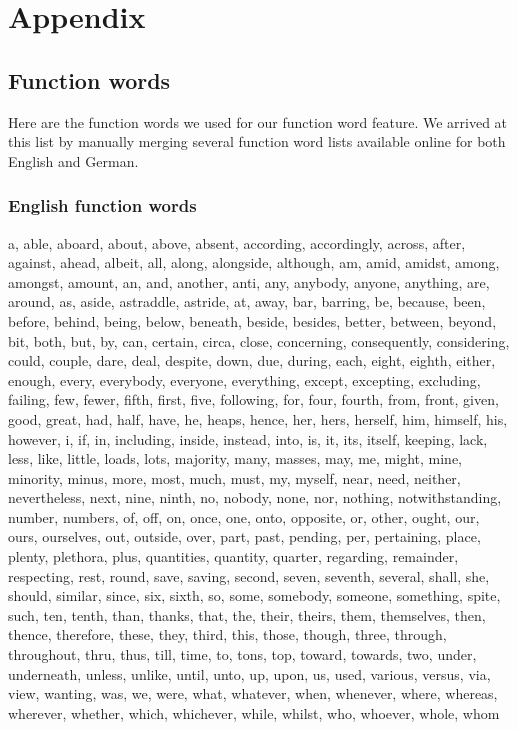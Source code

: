 \section{Appendix}
\label{sec:appendix}

\subsection{Function words}
\label{sec:app_function_words}
Here are the function words we used for our function word feature. We arrived at this list by manually merging several function word lists available online for both English and German.


\subsubsection{English function words}
a, able, aboard, about, above, absent, according, accordingly, across, after, against, ahead, albeit, all, along, alongside, although, am, amid, amidst, among, amongst, amount, an, and, another, anti, any, anybody, anyone, anything, are, around, as, aside, astraddle, astride, at, away, bar, barring, be, because, been, before, behind, being, below, beneath, beside, besides, better, between, beyond, bit, both, but, by, can, certain, circa, close, concerning, consequently, considering, could, couple, dare, deal, despite, down, due, during, each, eight, eighth, either, enough, every, everybody, everyone, everything, except, excepting, excluding, failing, few, fewer, fifth, first, five, following, for, four, fourth, from, front, given, good, great, had, half, have, he, heaps, hence, her, hers, herself, him, himself, his, however, i, if, in, including, inside, instead, into, is, it, its, itself, keeping, lack, less, like, little, loads, lots, majority, many, masses, may, me, might, mine, minority, minus, more, most, much, must, my, myself, near, need, neither, nevertheless, next, nine, ninth, no, nobody, none, nor, nothing, notwithstanding, number, numbers, of, off, on, once, one, onto, opposite, or, other, ought, our, ours, ourselves, out, outside, over, part, past, pending, per, pertaining, place, plenty, plethora, plus, quantities, quantity, quarter, regarding, remainder, respecting, rest, round, save, saving, second, seven, seventh, several, shall, she, should, similar, since, six, sixth, so, some, somebody, someone, something, spite, such, ten, tenth, than, thanks, that, the, their, theirs, them, themselves, then, thence, therefore, these, they, third, this, those, though, three, through, throughout, thru, thus, till, time, to, tons, top, toward, towards, two, under, underneath, unless, unlike, until, unto, up, upon, us, used, various, versus, via, view, wanting, was, we, were, what, whatever, when, whenever, where, whereas, wherever, whether, which, whichever, while, whilst, who, whoever, whole, whom


